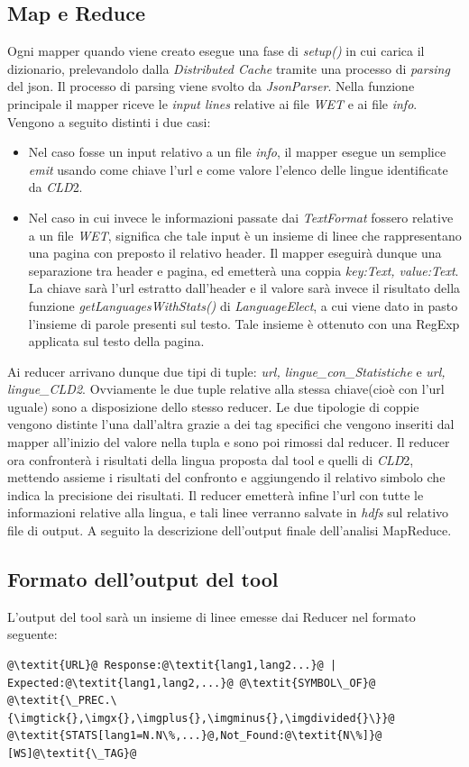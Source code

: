 \documentclass{article}
\newcommand{\MR}{MapReduce}
\newcommand{\cld}{\textit{CLD}2}
\newcommand{\WET}{\textit{WET}}
\newcommand{\info}{\textit{info}}
\newcommand{\DC}{\textit{Distributed Cache}}
\newcommand{\class}[1]{\textit{#1}}
\newcommand{\function}[1]{\textit{#1}}
\begin{document}
\subsection{Map e Reduce}
Ogni mapper quando viene creato esegue una fase di \function{setup()} in cui carica il dizionario, prelevandolo dalla \DC{} tramite una processo di \textit{parsing} del json. Il processo di parsing viene svolto da \function{JsonParser}. Nella funzione principale il mapper riceve le \textit{input lines} relative ai file \WET{} e ai file \info{}. Vengono a seguito distinti i due casi:
\begin{itemize}
    \item Nel caso fosse un input relativo a un file \info{}, il mapper esegue un semplice \textit{emit} usando come chiave l'url e come valore l'elenco delle lingue identificate da \cld{}.
    \item Nel caso in cui invece le informazioni passate dai \textit{TextFormat} fossero relative a un file \WET{}, significa che tale input è un insieme di linee che rappresentano una pagina con preposto il relativo header. Il mapper eseguirà dunque una separazione tra header e pagina, ed emetterà una coppia \textit{\textlangle key:Text, value:Text\textrangle}. La chiave sarà l'url estratto dall'header e il valore sarà invece il risultato della funzione \function{getLanguagesWithStats()} di \class{LanguageElect}, a cui viene dato in pasto l'insieme di parole presenti sul testo. Tale insieme è ottenuto con una RegExp applicata sul testo della pagina.
\end{itemize}

Ai reducer arrivano dunque due tipi di tuple: \textit{\textlangle url, lingue\_con\_Statistiche\textrangle} e \textit{\textlangle url, lingue\_\cld\textrangle}. Ovviamente le due tuple relative alla stessa chiave(cioè con l'url uguale) sono a disposizione dello stesso reducer. Le due tipologie di coppie vengono distinte l'una dall'altra grazie a dei tag specifici che vengono inseriti dal mapper all'inizio del valore nella tupla e sono poi rimossi dal reducer. Il reducer ora confronterà i risultati della lingua proposta dal tool e quelli di \cld{}, mettendo assieme i risultati del confronto e aggiungendo il relativo simbolo che indica la precisione dei risultati. Il reducer emetterà infine l'url con tutte le informazioni relative alla lingua, e tali linee verranno salvate in \textit{hdfs} sul relativo file di output. A seguito la descrizione dell'output finale dell'analisi \MR{}. 

\subsection{Formato dell'output del tool}
L'output del tool sarà un insieme di linee emesse dai Reducer nel formato seguente:
\begin{verbatim}
@\textit{URL}@ Response:@\textit{lang1,lang2...}@ | Expected:@\textit{lang1,lang2,...}@ @\textit{SYMBOL\_OF}@
@\textit{\_PREC.\{\imgtick{},\imgx{},\imgplus{},\imgminus{},\imgdivided{}\}}@ @\textit{STATS[lang1=N.N\%,...}@,Not_Found:@\textit{N\%]}@ [WS]@\textit{\_TAG}@
\end{verbatim}
\end{document}
